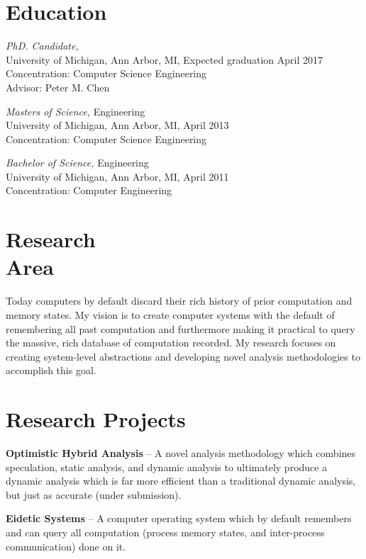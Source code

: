 \documentclass[margin, 10pt]{res} %
\begin{document}
\begin{resume}
 

\section{Education}

{\sl PhD. Candidate,} \\
University of Michigan, Ann Arbor, MI, Expected graduation April 2017 \\
Concentration: Computer Science Engineering \\
Advisor: Peter M. Chen

{\sl Masters of Science,} Engineering \\
University of Michigan, Ann Arbor, MI, April 2013 \\
Concentration: Computer Science Engineering

{\sl Bachelor of Science,} Engineering \\
University of Michigan, Ann Arbor, MI, April 2011 \\
Concentration: Computer Engineering


\section{Research \\Area}
Today computers by default discard their rich history of prior computation and
memory states.  My vision is to create computer systems with the default of
remembering all past computation and furthermore making it practical to query
the massive, rich database of computation recorded.  My research focuses on
creating system-level abstractions and developing novel analysis methodologies
to accomplish this goal.  

\section{Research Projects}
\textbf{Optimistic Hybrid Analysis} -- A novel analysis methodology
which combines speculation, static analysis, and dynamic analysis to
ultimately produce a dynamic analysis which is far more efficient than
a traditional dynamic analysis, but just as accurate (under
submission).

\textbf{Eidetic Systems} -- A computer operating system which by
default remembers and can query all computation (process memory states, and
inter-process communication) done on it.


\end{resume}
\end{document}
